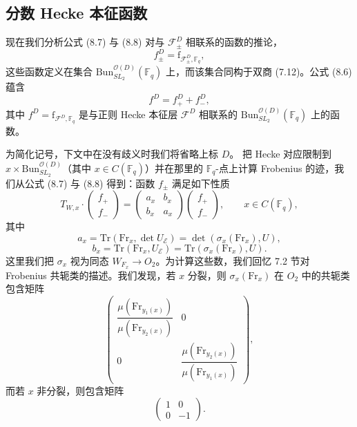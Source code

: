 \documentclass[11pt,a4paper]{article}
\newcommand{\Bun}{\mathrm{Bun}}
\begin{document}
\subsection{分数 Hecke 本征函数}

现在我们分析公式 (8.7) 与 (8.8) 对与 $\mathcal{F}^D_\pm$ 相联系的函数的推论，
\[
f^D_\pm = \mathrm{f}_{\mathcal{F}^D_\pm,\mathbb{F}_q},
\]
这些函数定义在集合 $\Bun^{\mathcal{O}(D)}_{SL_2}(\mathbb{F}_q)$ 上，而该集合同构于双商 (7.12)。公式 (8.6) 蕴含
\begin{equation}\tag{8.10}
f^D = f^D_+ + f^D_-,
\end{equation}
其中 $f^D = \mathrm{f}_{\mathcal{F}^D,\mathbb{F}_q}$ 是与正则 Hecke 本征层 $\mathcal{F}^D$ 相联系的 $\Bun^{\mathcal{O}(D)}_{SL_2}(\mathbb{F}_q)$ 上的函数。

为简化记号，下文中在没有歧义时我们将省略上标 $D$。
把 Hecke 对应限制到 $x\times \Bun^{\mathcal{O}(D)}_{SL_2}$（其中 $x\in C(\mathbb{F}_q)$）并在那里的 $\mathbb{F}_q$-点上计算 Frobenius 的迹，我们从公式 (8.7) 与 (8.8) 得到：函数 $f_\pm$ 满足如下性质
\begin{equation}\tag{8.11}
T_{W,x}\cdot \begin{pmatrix} f_+\\ f_-\end{pmatrix} = \begin{pmatrix} a_x & b_x\\ b_x & a_x\end{pmatrix}\begin{pmatrix} f_+\\ f_-\end{pmatrix}, \qquad x\in C(\mathbb{F}_q),
\end{equation}
其中
\[
a_x = \mathrm{Tr}(\mathrm{Fr}_x, \det U_{\mathcal{E}}) = \det(\sigma_x(\mathrm{Fr}_x), U),
\]
\[
b_x = \mathrm{Tr}(\mathrm{Fr}_x, U_{\mathcal{E}}) = \mathrm{Tr}(\sigma_x(\mathrm{Fr}_x), U).
\]
这里我们把 $\sigma_x$ 视为同态 $W_{F_x}\to O_2$。为计算这些数，我们回忆 7.2 节对 Frobenius 共轭类的描述。我们发现，若 $x$ 分裂，则 $\sigma_x(\mathrm{Fr}_x)$ 在 $O_2$ 中的共轭类包含矩阵
\[
\begin{pmatrix}
\dfrac{\mu(\mathrm{Fr}_{y_1(x)})}{\mu(\mathrm{Fr}_{y_2(x)})} & 0\\[10pt]
0 & \dfrac{\mu(\mathrm{Fr}_{y_2(x)})}{\mu(\mathrm{Fr}_{y_1(x)})}
\end{pmatrix},
\]
而若 $x$ 非分裂，则包含矩阵
\[
\begin{pmatrix} 1 & 0\\ 0 & -1\end{pmatrix}.
\]
\end{document}
